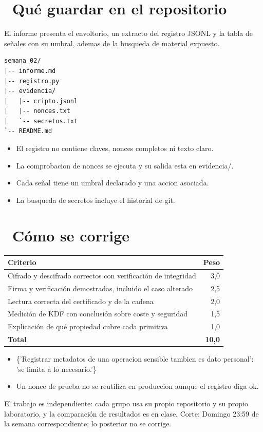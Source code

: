 \documentclass[11pt,a4paper]{article}
\newcommand{\iconotexto}[2]{\textcolor{cyanNeon}{\faIcon{#1}}~#2}
\begin{document}
\section{\iconotexto{box-open}{Qué guardar en el repositorio}}

El informe presenta el envoltorio, un extracto del registro JSONL y la tabla de señales con su umbral, ademas de la busqueda de material expuesto.

\begin{lstlisting}[style=estiloCodigo]
semana_02/
|-- informe.md
|-- registro.py
|-- evidencia/
|   |-- cripto.jsonl
|   |-- nonces.txt
|   `-- secretos.txt
`-- README.md
\end{lstlisting}

\begin{itemize}[leftmargin=1.4em,itemsep=2pt,topsep=3pt]
  \item El registro no contiene claves, nonces completos ni texto claro.
  \item La comprobacion de nonces se ejecuta y su salida esta en evidencia/.
  \item Cada señal tiene un umbral declarado y una accion asociada.
  \item La busqueda de secretos incluye el historial de git.
\end{itemize}

\section{\iconotexto{ruler-combined}{Cómo se corrige}}

\begin{tabularx}{\linewidth}{@{}X r@{}}
\toprule
Criterio & Peso\\
\midrule
Cifrado y descifrado correctos con verificación de integridad & 3,0 \\
Firma y verificación demostradas, incluido el caso alterado & 2,5 \\
Lectura correcta del certificado y de la cadena & 2,0 \\
Medición de KDF con conclusión sobre coste y seguridad & 1,5 \\
Explicación de qué propiedad cubre cada primitiva & 1,0 \\
\midrule
\textbf{Total} & \textbf{10,0}\\
\bottomrule
\end{tabularx}

\begin{itemize}[leftmargin=1.4em,itemsep=2pt,topsep=3pt]
  \item \{'Registrar metadatos de una operacion sensible tambien es dato personal': 'se limita a lo necesario.'\}
  \item Un nonce de prueba no se reutiliza en produccion aunque el registro diga ok.
\end{itemize}

\begin{cajaRecuerda}El trabajo es independiente: cada grupo usa su propio repositorio y su propio laboratorio, y la comparación de resultados es en clase. Corte: Domingo 23:59 de la semana correspondiente; lo posterior no se corrige.
\end{cajaRecuerda}
\end{document}
